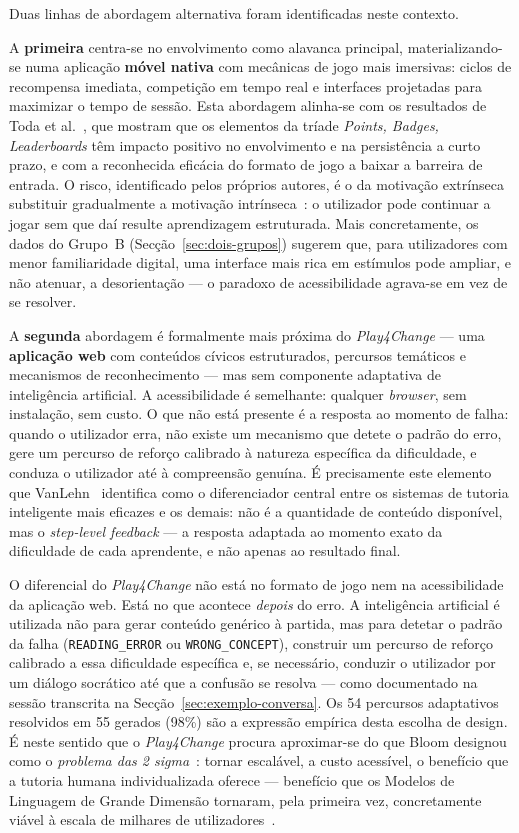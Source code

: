 Duas linhas de abordagem alternativa foram identificadas neste contexto.

A \textbf{primeira} centra-se no envolvimento como alavanca principal, materializando-se numa aplicação \textbf{móvel nativa} com mecânicas de jogo mais imersivas: ciclos de recompensa imediata, competição em tempo real e interfaces projetadas para maximizar o tempo de sessão. Esta abordagem alinha-se com os resultados de Toda et al.~\cite{ott2019gamification}, que mostram que os elementos da tríade \emph{Points, Badges, Leaderboards} têm impacto positivo no envolvimento e na persistência a curto prazo, e com a reconhecida eficácia do formato de jogo a baixar a barreira de entrada. O risco, identificado pelos próprios autores, é o da motivação extrínseca substituir gradualmente a motivação intrínseca~\cite{deci1985intrinsic}: o utilizador pode continuar a jogar sem que daí resulte aprendizagem estruturada. Mais concretamente, os dados do Grupo~B (Secção~\ref{sec:dois-grupos}) sugerem que, para utilizadores com menor familiaridade digital, uma interface mais rica em estímulos pode ampliar, e não atenuar, a desorientação --- o paradoxo de acessibilidade agrava-se em vez de se resolver.

A \textbf{segunda} abordagem é formalmente mais próxima do \emph{Play4Change} --- uma \textbf{aplicação web} com conteúdos cívicos estruturados, percursos temáticos e mecanismos de reconhecimento --- mas sem componente adaptativa de inteligência artificial. A acessibilidade é semelhante: qualquer \emph{browser}, sem instalação, sem custo. O que não está presente é a resposta ao momento de falha: quando o utilizador erra, não existe um mecanismo que detete o padrão do erro, gere um percurso de reforço calibrado à natureza específica da dificuldade, e conduza o utilizador até à compreensão genuína. É precisamente este elemento que VanLehn~\cite{vanlehn2011relative} identifica como o diferenciador central entre os sistemas de tutoria inteligente mais eficazes e os demais: não é a quantidade de conteúdo disponível, mas o \emph{step-level feedback} --- a resposta adaptada ao momento exato da dificuldade de cada aprendente, e não apenas ao resultado final.

O diferencial do \emph{Play4Change} não está no formato de jogo nem na acessibilidade da aplicação web. Está no que acontece \emph{depois} do erro. A inteligência artificial é utilizada não para gerar conteúdo genérico à partida, mas para detetar o padrão da falha (\texttt{READING\_ERROR} ou \texttt{WRONG\_CONCEPT}), construir um percurso de reforço calibrado a essa dificuldade específica e, se necessário, conduzir o utilizador por um diálogo socrático até que a confusão se resolva --- como documentado na sessão transcrita na Secção~\ref{sec:exemplo-conversa}. Os 54 percursos adaptativos resolvidos em 55 gerados (98\%) são a expressão empírica desta escolha de design. É neste sentido que o \emph{Play4Change} procura aproximar-se do que Bloom designou como o \emph{problema das 2 sigma}~\cite{bloom1984sigma}: tornar escalável, a custo acessível, o benefício que a tutoria humana individualizada oferece --- benefício que os Modelos de Linguagem de Grande Dimensão tornaram, pela primeira vez, concretamente viável à escala de milhares de utilizadores~\cite{kasneci2023chatgpt}.


